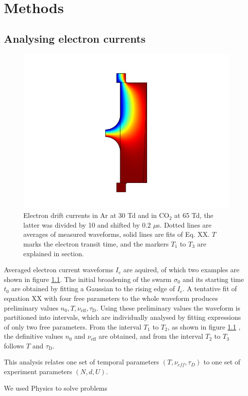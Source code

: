 \chapter{Methods}

\section{Analysing electron currents} \label{sec.analysecurrent}

\begin{figure}[htbp]
	\centering
	\includegraphics{figures/COMSOL_Beispielbild.jpg}		
	\caption[Kurze Abbildungsbeschreibung]{Electron drift currents in Ar at 30 Td and in CO$_2$ at 65 Td, the latter was divided by 10 and shifted by 0.2 $\mu$s. Dotted lines are averages of measured waveforms, solid lines are fits of Eq. XX. $T$ marks the electron transit time, and the markers $T_1$ to $T_3$ are explained in section.} %
	\label{fig.waveforms}
\end{figure}
Averaged electron current waveforms $I_e$ are aquired, of which two examples are shown in figure \ref{fig.waveforms}.
The initial broadening of the swarm $\sigma_0$ and its starting time $t_0$ are obtained by fitting a Gaussian to the rising edge of $I_e$. A tentative fit of equation XX with four free parameters to the whole waveform produces preliminary values $n_0, T, \nu_{\mathrm{eff}}, \tau_{\mathrm{D}}$. Using these preliminary values the waveform is partitioned into intervals, which are individually analysed by fitting expressions of only two free parameters. From the interval $T_1$ to $T_2$, as shown in figure \ref{fig.waveforms}
, the definitive values $n_0$ and $\nu_{\mathrm{eff}}$ are obtained, and from the interval $T_2$ to $T_3$ follows $T$ and $\tau{_\mathrm{D}}$.

This analysis relates one set of temporal parameters $(T, \nu_{eff}, \tau_{D})$ to one set of experiment parameters $(N, d, U)$.

We used Physics to solve problems